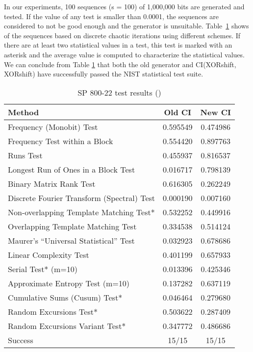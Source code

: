 \documentclass[10pt, a4paper, conference, compsocconf]{IEEEtran}
\begin{document}
In our experiments, 100 sequences (s = 100) of 1,000,000 bits are generated and tested. If the value  of any test is smaller than 0.0001, the sequences are considered to not be good enough and the generator is unsuitable. Table~\ref{The passing rate} shows  of the sequences based on discrete chaotic iterations using different schemes. If there are at least two statistical values in a test, this test is marked with an asterisk and the average value is computed to characterize the statistical values. 
We can conclude from Table \ref{The passing rate} that both the old generator and CI(XORshift, XORshift) have successfully passed the NIST statistical test suite.
\begin{table}[!t]
\renewcommand{\arraystretch}{1.3}
\caption{SP 800-22 test results ()}
\label{The passing rate}
\centering
  \begin{tabular}{|l||c|c|}
    \hline
Method & Old CI & New CI  \\ \hline\hline

Frequency (Monobit) Test 			&0.595549&0.474986 \\ \hline
Frequency Test within a Block  			&0.554420&0.897763  \\ \hline
Runs Test 					&0.455937&0.816537 \\ \hline
Longest Run of Ones in a Block Test 		&0.016717&0.798139   \\ \hline
Binary Matrix Rank Test 			&0.616305&0.262249  \\ \hline
Discrete Fourier Transform (Spectral) Test	&0.000190&0.007160   \\ \hline
Non-overlapping Template Matching Test* 	&0.532252&0.449916 \\ \hline
Overlapping Template Matching Test   		&0.334538&0.514124  \\ \hline
Maurer’s “Universal Statistical” Test   	&0.032923&0.678686  \\ \hline
Linear Complexity Test  			&0.401199&0.657933    \\ \hline
Serial Test* (m=10) 				&0.013396&0.425346  \\ \hline
Approximate Entropy Test (m=10) 		&0.137282&0.637119  \\ \hline
Cumulative Sums (Cusum) Test* 			&0.046464&0.279680\\ \hline
Random Excursions Test* 			&0.503622&0.287409   \\ \hline
Random Excursions Variant Test* 		&0.347772&0.486686    \\ \hline
Success & 15/15 & 15/15 \\ \hline
    \hline
  \end{tabular}
\end{table}
\end{document}
